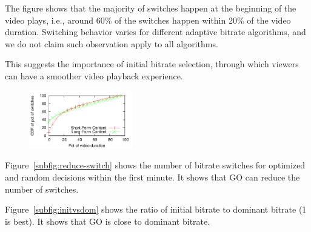 The figure shows that the majority of switches happen at the beginning of the video plays, i.e., around 60\% of the switches 
happen within 20\% of the video duration. Switching behavior varies for different adaptive bitrate algorithms, and we do not 
claim such observation apply to all algorithms.

This suggests the importance of initial bitrate selection, through which viewers can have a smoother video playback experience.

\begin{figure}[h!]
\centering
 \includegraphics[width=0.4\textwidth] {figures/switch-time-dist.pdf}
\label{fig:switch-time-dist}
\end{figure}


Figure~\ref{subfig:reduce-switch} shows the number of bitrate switches for optimized and random decisions within the first minute. 
It shows that GO can reduce the number of switches.


Figure~\ref{subfig:initvsdom} shows the ratio of initial bitrate to dominant bitrate (1 is best). It shows that GO is close to dominant bitrate.
